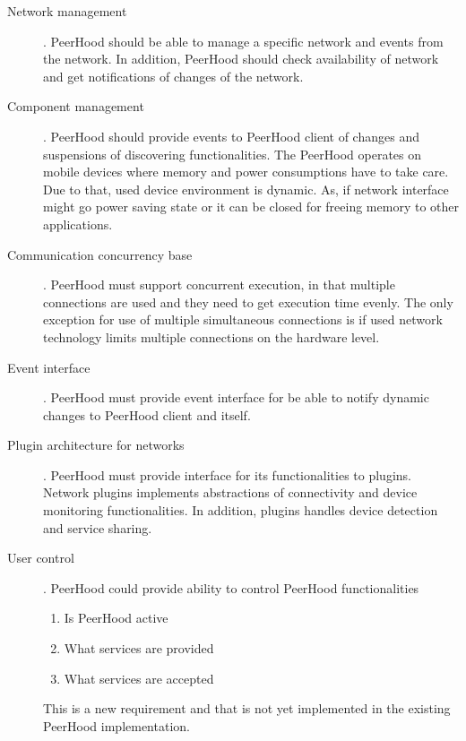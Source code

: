 \begin{description}
		\item[Network management]. PeerHood should be able to manage a specific network and events 
		from the network. 
		\Sentence
		In addition, PeerHood should check availability of network and get notifications of changes 
		of the network.

		\item[Component management]. PeerHood should provide events to PeerHood client of changes 
		and suspensions of discovering functionalities. 
		\Sentence
		The PeerHood operates on mobile devices where memory and power consumptions have to take 
		care. 
		\Sentence
		Due to that, used device environment is dynamic. 
		\Sentence
		As, if network interface might go power saving state or it can be closed for freeing memory 
		to other applications.

		\item[Communication concurrency base]. PeerHood must support concurrent execution, in that 
		multiple connections are used and they need to get execution time evenly. 
		\Sentence
		The only exception for use of multiple simultaneous connections is if used network 
		technology limits multiple connections on the hardware level.

		\item[Event interface]. PeerHood must provide event interface for be able to notify 
		dynamic changes to PeerHood client and itself.

		\item[Plugin architecture for networks]. PeerHood must provide interface for its 
		functionalities to plugins. 
		\Sentence
		Network plugins implements abstractions of connectivity and device monitoring 
		functionalities. 
		\Sentence
		In addition, plugins handles device detection and service sharing.

		\item[User control]. PeerHood could provide ability to control PeerHood functionalities
		\begin{enumerate}
			\item Is PeerHood active
			\item What services are provided
			\item What services are accepted
		\end{enumerate}

		This is a new requirement and that is not yet implemented in the existing PeerHood 
		implementation.
\end{description}